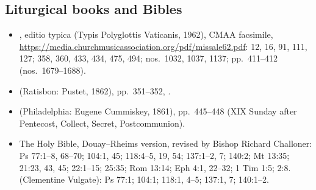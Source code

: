 {\scriptsize
\subsection*{Liturgical books and Bibles}
\begin{itemize}\setlength{\itemsep}{0.15em}\setlength{\parskip}{0pt}
\item {}, editio typica (Typis Polyglottis Vaticanis, 1962), CMAA facsimile, \url{https://media.churchmusicassociation.org/pdf/missale62.pdf}:  12, 16, 91, 111, 127;  358, 360, 433, 434, 475, 494;  nos.~1032, 1037, 1137; pp.~411--412 (nos.~1679--1688).
\item {} (Ratisbon: Pustet, 1862), pp.~351--352, .
\item {} (Philadelphia: Eugene Cummiskey, 1861), pp.~445--448 (XIX Sunday after Pentecost, Collect, Secret, Postcommunion).
\item The Holy Bible, Douay--Rheims version, revised by Bishop Richard Challoner: Ps 77:1--8, 68--70; 104:1, 45; 118:4--5, 19, 54; 137:1--2, 7; 140:2; Mt 13:35; 21:23, 43, 45; 22:1--15; 25:35; Rom 13:14; Eph 4:1, 22--32; 1 Tim 1:5; 2:8.  (Clementine Vulgate): Ps 77:1; 104:1; 118:1, 4--5; 137:1, 7; 140:1--2.
\end{itemize}

}
